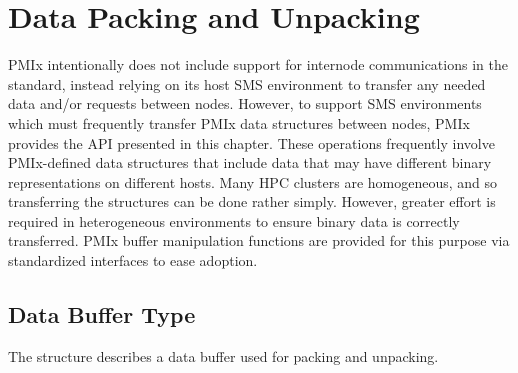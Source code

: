 \chapter{Data Packing and Unpacking}
\label{chap:api_data_mgmt}

\ac{PMIx} intentionally does not include support for internode communications in the standard, instead relying on its host \ac{SMS} environment to transfer any needed data and/or requests between nodes.  However, to support \ac{SMS} environments which must frequently transfer \ac{PMIx} data structures between nodes, \ac{PMIx} provides the \acs{API} presented in this chapter. These operations frequently involve PMIx-defined data structures that include data that may have different binary representations on different hosts. Many \ac{HPC} clusters are homogeneous, and so transferring the structures can be done rather simply. However, greater effort is required in heterogeneous environments to ensure binary data is correctly transferred. \ac{PMIx} buffer manipulation functions are provided for this purpose via standardized interfaces to ease adoption.

\section{Data Buffer Type}

The  structure describes a data buffer used for packing and unpacking.

